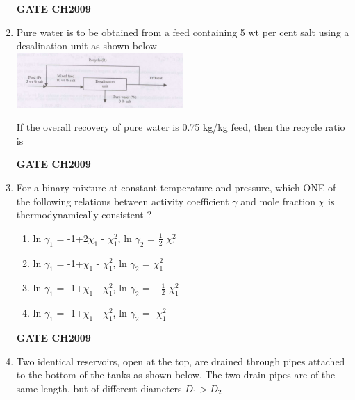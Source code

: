 \documentclass[journal,12pt,onecolumn]{IEEEtran}
\theoremstyle{remark}
\begin{document}
\begin{enumerate}
		\hfill
		\textbf{GATE CH2009} 
		
		\item Pure water  is to be obtained from a feed containing 5 wt per cent salt using a desalination unit as shown below
		\\ \includegraphics[width=0.5\textwidth]{q28.png}
		
		If the overall recovery of pure water  is 0.75 kg/kg feed, then the recycle ratio  is 
		\begin{enumerate}
		\end{enumerate}
		
		\hfill
		\textbf{GATE CH2009} 
		
		\item For a binary mixture at constant temperature and pressure, which ONE of the following relations between activity coefficient $\gamma$ and mole fraction $\chi$ is thermodynamically consistent ? 
		\begin{enumerate}
			\item ln $\gamma_1$ = -1+2$\chi_{1}$ - $\chi_{1}^2$, ln $\gamma_{2}$ = $\frac{1}{2}$ $\chi_{1}^2$
			\item ln $\gamma_{1}$ = -1+$\chi_{1}$ - $\chi_{1}^2$, ln $\gamma_{2}$ = $\chi_{1}^2$
			\item ln $\gamma_{1}$ = -1+$\chi_{1}$ - $\chi_{1}^2$, ln $\gamma_{2}$ = $-\frac{1}{2}$ $\chi_{1}^2$
			\item ln $\gamma_{1}$ = -1+$\chi_{1}$ - $\chi_{1}^2$, ln $\gamma_{2}$ = -$\chi_{1}^2$
		\end{enumerate}
		
		\hfill
		\textbf{GATE CH2009} 
		
		\item Two identical reservoirs, open at the top, are drained through pipes attached to the bottom of the tanks as shown below. The two drain pipes are of the same length, but of different diameters $D_1>D_2$
		

\end{enumerate}
\end{document}
